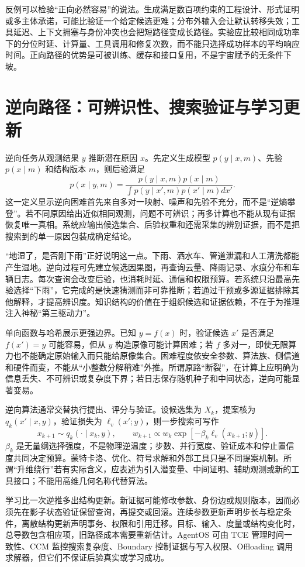 反例可以检验“正向必然容易”的说法。生成满足数百项约束的工程设计、形式证明或多主体承诺，可能比验证一个给定候选更难；分布外输入会让默认转移失效；工具延迟、上下文拥塞与身份冲突也会把短路径变成长路径。实验应比较相同成功率下的分位时延、计算量、工具调用和修复次数，而不能只选择成功样本的平均响应时间。正向路径的优势是可被训练、缓存和接口复用，不是宇宙赋予的无条件下坡。

\section{逆向路径：可辨识性、搜索验证与学习更新}
\label{sec:reverse_flow}

逆向任务从观测结果 $y$ 推断潜在原因 $x$。先定义生成模型 $p(y\mid x,m)$、先验 $p(x\mid m)$ 和结构版本 $m$，则后验满足
\[
p(x\mid y,m)=\frac{p(y\mid x,m)p(x\mid m)}{\int p(y\mid x',m)p(x'\mid m)dx'}.
\]
这一定义显示逆向困难首先来自多对一映射、噪声和先验不充分，而不是“逆熵攀登”。若不同原因给出近似相同观测，问题不可辨识；再多计算也不能从现有证据恢复唯一真相。系统应输出候选集合、后验权重和还需采集的辨别证据，而不是把搜索到的单一原因包装成确定结论。

“地湿了，是否刚下雨”正好说明这一点。下雨、洒水车、管道泄漏和人工清洗都能产生湿地。逆向过程可先建立候选因果图，再查询云量、降雨记录、水痕分布和车辆日志。每次查询会改变后验，也消耗时延、通信和权限预算。若系统只沿最高先验选择“下雨”，它完成的是快速猜测而非可靠推断；若通过干预或多源证据排除其他解释，才提高辨识度。知识结构的价值在于组织候选和证据依赖，不在于为推理注入神秘“第三驱动力”。

单向函数与哈希展示更强边界。已知 $y=f(x)$ 时，验证候选 $x'$ 是否满足 $f(x')=y$ 可能容易，但从 $y$ 构造原像可能计算困难；若 $f$ 多对一，即使无限算力也不能确定原始输入而只能给原像集合。困难程度依安全参数、算法族、侧信道和硬件而变，不能从“小整数分解稍难”外推。所谓原路“断裂”，在计算上应明确为信息丢失、不可辨识或复杂度下界；若日志保存随机种子和中间状态，逆向可能显著变易。

逆向算法通常交替执行提出、评分与验证。设候选集为 $X_k$，提案核为 $q_k(x'\mid x,y)$，验证损失为 $\ell_v(x';y)$，则一步搜索可写作
\[
x_{k+1}\sim q_k(\cdot\mid x_k,y),\qquad
w_{k+1}\propto w_k\exp[-\beta_k\ell_v(x_{k+1};y)].
\]
$\beta_k$ 是无量纲选择强度，不是物理逆温度；步数、并行宽度、验证成本和停止置信度共同决定预算。蒙特卡洛、优化、符号求解和外部工具只是不同提案机制。所谓“升维绕行”若有实际含义，应表述为引入潜变量、中间证明、辅助观测或新的工具接口；不能用高维几何名称代替算法。

学习比一次逆推多出结构更新。新证据可能修改参数、身份边或规则版本，因而必须先在影子状态验证保留查询，再提交或回滚。连续参数更新声明步长与稳定条件，离散结构更新声明事务、权限和引用迁移。目标、输入、度量或结构变化时，总导数包含相应项，旧路径成本需要重新估计。AgentOS 可由 TCE 管理时间一致性、CCM 监控搜索复杂度、Boundary 控制证据与写入权限、Offloading 调用求解器，但它们不保证后验真实或学习成功。

